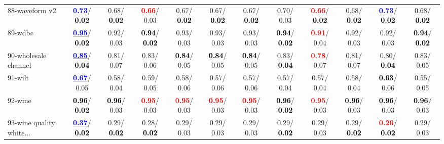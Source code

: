\begin{table}[h]
\begin{center}
{\begin{tabular}{lc|c|c|c|c|c|c|c|c|c|c}
88-waveform v2 & \textcolor{blue}{\textbf{  0.73}}/\textcolor{black}{\textbf{  0.02}} &   0.68/\textcolor{black}{\textbf{  0.02}} & \textcolor{red}{\textbf{  0.66}}/  0.03 &   0.67/\textcolor{black}{\textbf{  0.02}} &   0.67/\textcolor{black}{\textbf{  0.02}} &   0.67/\textcolor{black}{\textbf{  0.02}} &   0.70/  0.03 & \textcolor{red}{\textbf{  0.66}}/\textcolor{black}{\textbf{  0.02}} &   0.68/\textcolor{black}{\textbf{  0.02}} & \textcolor{blue}{\textbf{  0.73}}/\textcolor{black}{\textbf{  0.02}} &   0.68/\textcolor{black}{\textbf{  0.02}} \\
89-wdbc & \underline{\textcolor{blue}{\textbf{  0.95}}}/\textcolor{black}{\textbf{  0.02}} &   0.92/  0.03 & \textcolor{black}{\textbf{  0.94}}/\textcolor{black}{\textbf{  0.02}} &   0.93/  0.03 &   0.93/  0.03 &   0.93/  0.03 & \textcolor{black}{\textbf{  0.94}}/\textcolor{black}{\textbf{  0.02}} & \textcolor{red}{\textbf{  0.91}}/  0.04 &   0.92/  0.03 &   0.92/  0.03 & \textcolor{black}{\textbf{  0.94}}/\textcolor{black}{\textbf{  0.02}} \\
90-wholesale channel & \underline{\textcolor{blue}{\textbf{  0.85}}}/\textcolor{black}{\textbf{  0.04}} &   0.81/  0.07 &   0.83/  0.06 & \textcolor{black}{\textbf{  0.84}}/  0.05 & \textcolor{black}{\textbf{  0.84}}/  0.05 & \textcolor{black}{\textbf{  0.84}}/  0.05 &   0.83/\textcolor{black}{\textbf{  0.04}} & \textcolor{red}{\textbf{  0.78}}/  0.07 &   0.81/  0.07 &   0.80/\textcolor{black}{\textbf{  0.04}} &   0.83/  0.05 \\
91-wilt & \underline{\textcolor{blue}{\textbf{  0.67}}}/  0.05 &   0.58/  0.04 &   0.59/  0.05 &   0.58/  0.06 &   0.57/  0.06 &   0.57/  0.06 &   0.57/  0.04 &   0.57/  0.04 &   0.58/  0.04 & \textcolor{black}{\textbf{  0.63}}/  0.06 &   0.55/  0.05 \\
92-wine & \textcolor{black}{\textbf{  0.96}}/\textcolor{black}{\textbf{  0.02}} & \textcolor{black}{\textbf{  0.96}}/  0.03 & \textcolor{red}{\textbf{  0.95}}/  0.03 & \textcolor{red}{\textbf{  0.95}}/  0.03 & \textcolor{red}{\textbf{  0.95}}/  0.03 & \textcolor{red}{\textbf{  0.95}}/  0.03 & \textcolor{black}{\textbf{  0.96}}/\textcolor{black}{\textbf{  0.02}} & \textcolor{red}{\textbf{  0.95}}/  0.03 & \textcolor{black}{\textbf{  0.96}}/  0.03 & \textcolor{black}{\textbf{  0.96}}/  0.03 & \textcolor{black}{\textbf{  0.96}}/  0.03 \\ \hline
93-wine quality white... & \underline{\textcolor{blue}{\textbf{  0.37}}}/\textcolor{black}{\textbf{  0.02}} &   0.29/\textcolor{black}{\textbf{  0.02}} &   0.28/\textcolor{black}{\textbf{  0.02}} &   0.29/  0.03 &   0.29/  0.03 &   0.29/  0.03 &   0.29/\textcolor{black}{\textbf{  0.02}} &   0.29/  0.03 &   0.29/\textcolor{black}{\textbf{  0.02}} & \textcolor{red}{\textbf{  0.26}}/\textcolor{black}{\textbf{  0.02}} &   0.29/  0.03 \\

\end{tabular}}
\end{center}
\end{table}
